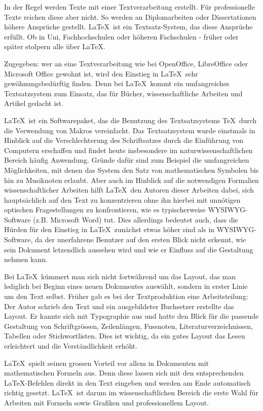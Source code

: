 
In der Regel werden Texte mit einer Textverarbeitung erstellt. Für professionelle Texte reichen diese aber nicht. So werden an Diplomarbeiten oder Dissertationen höhere Ansprüche gestellt. \LaTeX~ist ein Textsatz-System, das diese Ansprüche erfüllt. Ob in Uni, Fachhochschulen oder höheren Fachschulen - früher oder später stolpern alle über \LaTeX.

Zugegeben: wer an eine Textverarbeitung wie bei OpenOffice, LibreOffice oder Microsoft Office gewohnt ist, wird den Einstieg in \LaTeX~sehr gewöhnungsbedürftig finden. Denn bei \LaTeX~kommt ein umfangreiches Textsatzsystem zum Einsatz, das für Bücher, wissenschaftliche Arbeiten und Artikel gedacht ist.  

\LaTeX~ist ein Softwarepaket, das die Benutzung des Textsatzsystems \TeX~durch die Verwendung von Makros vereinfacht. Das Textsatzsystem wurde einstmals in Hinblick auf die Verschlechterung des Schriftsatzes durch die Einführung von Computern erschaffen und findet heute insbesondere im naturwissenschaftlichen Bereich häufig Anwendung. Gründe dafür sind zum Beispiel die umfangreichen Möglichkeiten, mit denen das System den Satz von mathematischen Symbolen bis hin zu Musiknoten erlaubt. Aber auch im Hinblick auf die notwendigen Formalien wissenschaftlicher Arbeiten hilft \LaTeX~den Autoren dieser Arbeiten dabei, sich hauptsächlich auf den Text zu konzentrieren ohne ihn hierbei mit unnötigen optischen Fragestellungen zu konfrontieren, wie es typischerweise WYSIWYG-Software (z.B. Microsoft Word) tut. Dies allerdings bedeutet auch, dass die Hürden für den Einstieg in \LaTeX~zunächst etwas höher sind als in WYSIWYG-Software, da der unerfahrene Benutzer auf den ersten Blick nicht erkennt, wie sein Dokument letzendlich aussehen wird und wie er Einfluss auf die Gestaltung nehmen kann.

Bei \LaTeX~kümmert man sich nicht fortwährend um das Layout, das man lediglich bei Beginn eines neuen Dokumentes auswählt, sondern in erster Linie um den Text selbst. Früher gab es bei der Textproduktion eine Arbeitsteilung: Der Autor schrieb den Text und ein ausgebildeter Buchsetzer erstellte das Layout. Er kannte sich mit Typographie aus und hatte den Blick für die passende Gestaltung von Schriftgrössen, Zeilenlängen, Fussnoten, Literaturverzeichnissen, Tabellen oder Stichwortlisten. Dies ist wichtig, da ein gutes Layout das Lesen erleichtert und die Verständlichkeit erhöht.

\LaTeX~spielt seinen grossen Vorteil vor allem in Dokumenten mit mathematischen Formeln aus. Denn diese lassen sich mit den entsprechenden \LaTeX-Befehlen direkt in den Text eingeben und werden am Ende automatisch richtig gesetzt. \LaTeX~ist darum im wissenschaftlichen Bereich die erste Wahl für Arbeiten mit Formeln sowie Grafiken und professionellem Layout. 

